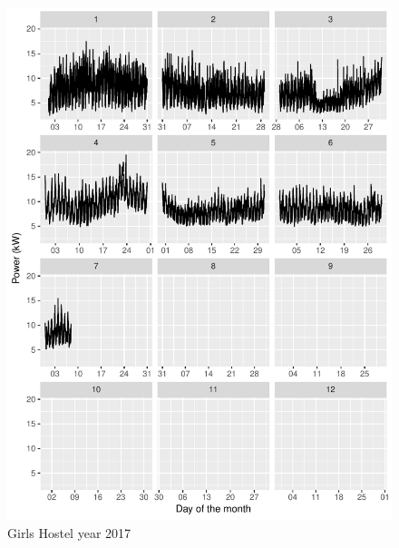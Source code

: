 \documentclass[11pt, oneside]{article}   	%
\begin{document}
\begin{figure}
\includegraphics[keepaspectratio]{girls_hostel_year2017.pdf}
\caption{Girls Hostel year 2017}
\end{figure}
\end{document}
